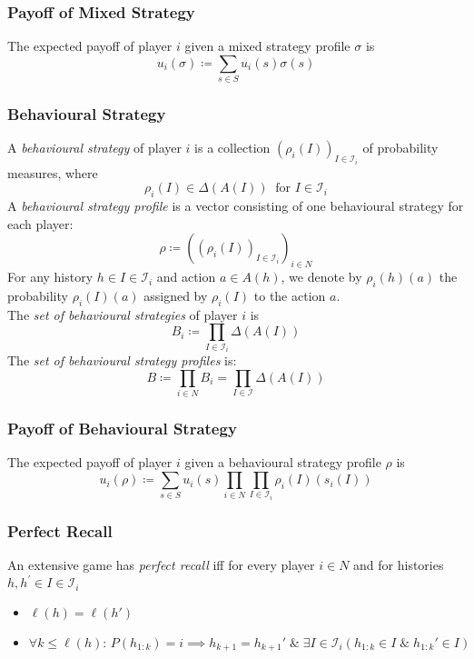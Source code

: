 \documentclass[UTF8,11pt,colorlinks,compress,openany]{beamer}%
\begin{document}
\begin{frame}\frametitle{Payoff of Mixed Strategy}
\begin{definition}
	The expected payoff of player $i$ given a mixed strategy profile $\sigma$ is
	\[u_i(\sigma)\coloneqq \sum\limits_{s\in S}u_i(s)\sigma(s)\]
\end{definition}
\end{frame}

\begin{frame}\frametitle{Behavioural Strategy}
\setlength\abovedisplayskip{0pt}
\begin{definition}
	A \emph{behavioural strategy} of player $i$ is a collection $(\rho_i(I))_{I\in\mathcal{I}_i}$ of probability measures, where \[\rho_i(I)\in\Delta(A(I))\;\;\text{for $I\in\mathcal{I}_i$}\]
	A \emph{behavioural strategy profile} is a vector consisting of one	behavioural strategy for each player:
	\[\rho\coloneqq \left((\rho_i(I))_{I\in\mathcal{I}_i}\right)_{i\in N}\]
	For any history $h\in I\in\mathcal{I}_i$ and action $a\in A(h)$, we denote by $\rho_i(h)(a)$ the probability $\rho_i(I)(a)$ assigned by $\rho_i(I)$ to the action $a$.\\
	The \emph{set of behavioural strategies} of player $i$ is
	\[B_i\coloneqq \prod\limits_{I\in\mathcal{I}_i}\Delta(A(I))\]
	The \emph{set of behavioural strategy profiles} is:
	\[B\coloneqq \prod\limits_{i\in N}B_i=\prod\limits_{I\in\mathcal{I}}\Delta(A(I))\]
\end{definition}
\end{frame}

\begin{frame}\frametitle{Payoff of Behavioural Strategy}
\begin{definition}
	The expected payoff of player $i$ given a behavioural strategy profile $\rho$ is
	\[u_i(\rho)\coloneqq \sum\limits_{s\in S}u_i(s)\prod\limits_{i\in N}\prod\limits_{I\in\mathcal{I}_i}\rho_i(I)(s_i(I))\]
\end{definition}
\end{frame}

\begin{frame}\frametitle{Perfect Recall}
\begin{definition}
	An extensive game has \emph{perfect recall} iff for every player $i\in N$ and for histories $h,h^\prime\in I\in\mathcal{I}_i$
\begin{itemize}
	\item $\ell(h)=\ell(h')$
	\item $\forall k\leq \ell(h):\,P(h_{1:k})=i\implies h_{k+1}=h_{k+1}'\;\&\;\exists I\in\mathcal{I}_i(h_{1:k}\in I\;\&\;h_{1:k}'\in I)$
\end{itemize}
\end{definition}	
\end{frame}
\end{document}
